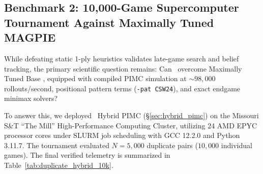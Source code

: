 \subsection{Benchmark 2: 10,000-Game Supercomputer Tournament Against Maximally Tuned MAGPIE}
\label{sec:hpc_benchmark}

While defeating static 1-ply heuristics validates late-game search and belief tracking, the primary scientific question remains: Can \algo\ overcome Maximally Tuned Base \magpie, equipped with compiled PIMC simulation at $\sim 98,000$ rollouts/second, positional pattern terms (\texttt{-pat CSW24}), and exact endgame minimax solvers?

To answer this, we deployed \algo\ Hybrid PIMC (\S\ref{sec:hybrid_pimc}) on the Missouri S\&T ``The Mill'' High-Performance Computing Cluster, utilizing 24 AMD EPYC processor cores under SLURM job scheduling with GCC 12.2.0 and Python 3.11.7. The tournament evaluated $N = 5,000$ duplicate pairs ($10,000$ individual games). The final verified telemetry is summarized in Table~\ref{tab:duplicate_hybrid_10k}.

